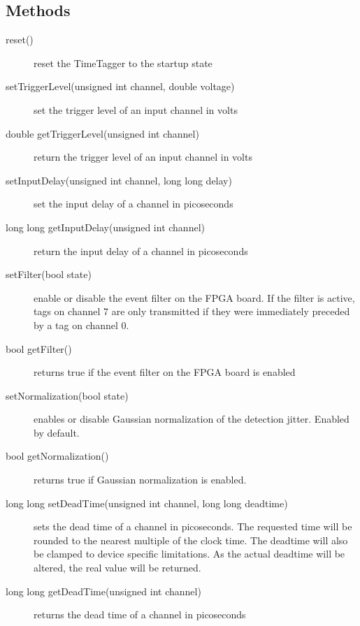\documentclass[letterpaper,10pt,english]{sphinxmanual}
\begin{document}
\subsection{Methods}
\label{sections/api:methods}\begin{description}
\item[{reset()}] \leavevmode
reset the TimeTagger to the startup state

\item[{setTriggerLevel(unsigned int channel, double voltage)}] \leavevmode
set the trigger level of an input channel in volts

\item[{double getTriggerLevel(unsigned int channel)}] \leavevmode
return the trigger level of an input channel in volts

\item[{setInputDelay(unsigned int channel, long long delay)}] \leavevmode
set the input delay of a channel in picoseconds

\item[{long long getInputDelay(unsigned int channel)}] \leavevmode
return the input delay of a channel in picoseconds

\item[{setFilter(bool state)}] \leavevmode
enable or disable the event filter on the FPGA board. If the filter
is active, tags on channel 7 are only transmitted if they were
immediately preceded by a tag on channel 0.

\item[{bool getFilter()}] \leavevmode
returns true if the event filter on the FPGA board is enabled

\item[{setNormalization(bool state)}] \leavevmode
enables or disable Gaussian normalization of the
detection jitter. Enabled by default.

\item[{bool getNormalization()}] \leavevmode
returns true if Gaussian normalization is enabled.

\item[{long long setDeadTime(unsigned int channel, long long deadtime)}] \leavevmode
sets the dead time of a channel in picoseconds. The requested time will
be rounded to the nearest multiple of the clock time. The deadtime will also
be clamped to device specific limitations. As the actual deadtime will
be altered, the real value will be returned.

\item[{long long getDeadTime(unsigned int channel)}] \leavevmode
returns the dead time of a channel in picoseconds


\end{description}
\end{document}
